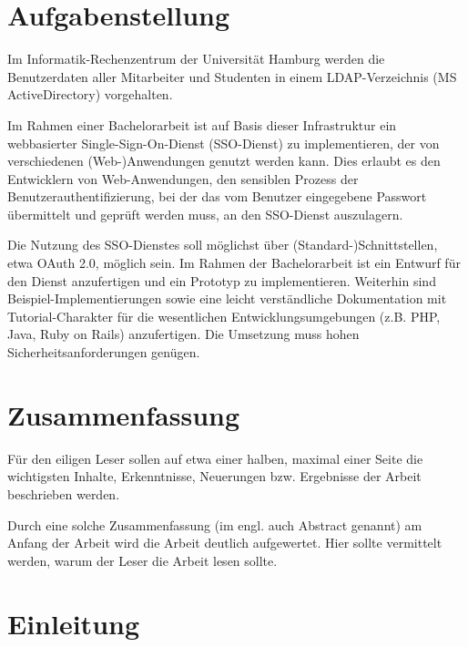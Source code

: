 \documentclass[12pt,a4paper,pointednumbers,abstracton]{scrartcl}
\newcommand{\changefont}[3]{
\fontfamily{#1} \fontseries{#2} \fontshape{#3} \selectfont}
\newcommand{\blankpage}{
\newpage
\thispagestyle{empty}
\null
\vfill
\begin{center}
	This page is intentionally left blank.
\end{center}
\newpage
}
\begin{document}
\normalsize
\changefont{ppl}{m}{n}
\newpage
\setcounter{page}{1}
\section*{Aufgabenstellung}

Im Informatik-Rechenzentrum der Universität Hamburg werden die Benutzerdaten aller Mitarbeiter und Studenten in einem LDAP-Verzeichnis (MS ActiveDirectory) vorgehalten.

Im Rahmen einer Bachelorarbeit ist auf Basis dieser Infrastruktur ein webbasierter Single-Sign-On-Dienst (SSO-Dienst) zu implementieren, der von verschiedenen (Web-)Anwendungen genutzt werden kann. Dies erlaubt es den Entwicklern von Web-Anwendungen, den sensiblen Prozess der Benutzerauthentifizierung, bei der das vom Benutzer eingegebene Passwort übermittelt und geprüft werden muss, an den SSO-Dienst auszulagern.

Die Nutzung des SSO-Dienstes soll möglichst über (Standard-)Schnittstellen, etwa OAuth 2.0, möglich sein. Im Rahmen der Bachelorarbeit ist ein Entwurf für den Dienst anzufertigen und ein Prototyp zu implementieren. Weiterhin sind Beispiel-Implementierungen sowie eine leicht verständliche Dokumentation mit Tutorial-Charakter für die wesentlichen Entwicklungsumgebungen (z.B. PHP, Java, Ruby on Rails) anzufertigen. Die Umsetzung muss hohen Sicherheitsanforderungen genügen.

\newpage
\section*{Zusammenfassung}

Für den eiligen Leser sollen auf etwa einer halben, maximal einer Seite die wichtigsten Inhalte, Erkenntnisse, Neuerungen bzw. Ergebnisse der Arbeit beschrieben werden. 

Durch eine solche Zusammenfassung (im engl. auch Abstract genannt) am Anfang der Arbeit wird die Arbeit deutlich aufgewertet. Hier sollte vermittelt werden, warum der Leser die Arbeit lesen sollte.

\newpage
\tableofcontents

\newpage
{}
\setcounter{page}{1}
\section{Einleitung}
\label{sec:einleitung}
\end{document}
